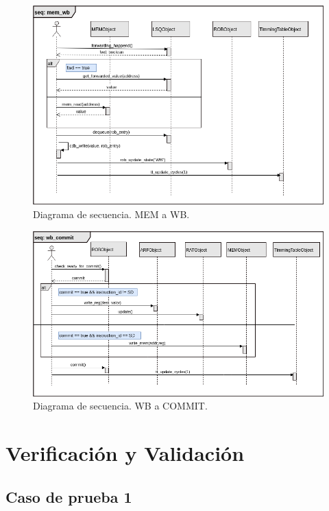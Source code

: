 \documentclass[a4paper]{article}
\begin{document}
	\begin{figure}[H]
		\centering
		\includegraphics[width=1\textwidth]{figures/mem_wb.png}
		\caption{\label{fig:mem_wb}Diagrama de secuencia. MEM a WB.}
	\end{figure}

	\begin{figure}[H]
		\centering
		\includegraphics[width=1\textwidth]{figures/wb_commit.png}
		\caption{\label{fig:wb_commit}Diagrama de secuencia. WB a COMMIT.}
	\end{figure}
	
	\section{Verificación y Validación}

	\subsection*{Caso de prueba 1}
\end{document}

